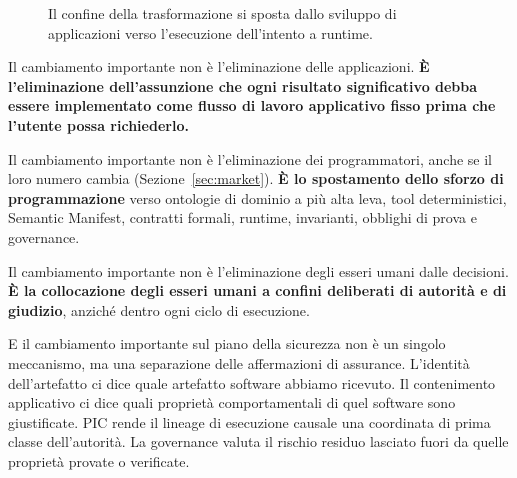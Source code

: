 \documentclass[10pt,oneside,openany]{book}
\begin{document}
\begin{figure}[ht]
\centering
{}
\caption{Il confine della trasformazione si sposta dallo sviluppo di applicazioni verso l'esecuzione dell'intento a runtime.}
\end{figure}

Il cambiamento importante non è l'eliminazione delle applicazioni. \textbf{È l'eliminazione dell'assunzione che ogni risultato significativo debba essere implementato come flusso di lavoro applicativo fisso prima che l'utente possa richiederlo.}

Il cambiamento importante non è l'eliminazione dei programmatori, anche se il loro numero cambia (Sezione~\ref{sec:market}). \textbf{È lo spostamento dello sforzo di programmazione} verso ontologie di dominio a più alta leva, tool deterministici, Semantic Manifest, contratti formali, runtime, invarianti, obblighi di prova e governance.

Il cambiamento importante non è l'eliminazione degli esseri umani dalle decisioni. \textbf{È la collocazione degli esseri umani a confini deliberati di autorità e di giudizio}, anziché dentro ogni ciclo di esecuzione.

E il cambiamento importante sul piano della sicurezza non è un singolo meccanismo, ma una separazione delle affermazioni di assurance. L'identità dell'artefatto ci dice quale artefatto software abbiamo ricevuto. Il contenimento applicativo ci dice quali proprietà comportamentali di quel software sono giustificate. PIC rende il lineage di esecuzione causale una coordinata di prima classe dell'autorità. La governance valuta il rischio residuo lasciato fuori da quelle proprietà provate o verificate.
\end{document}
